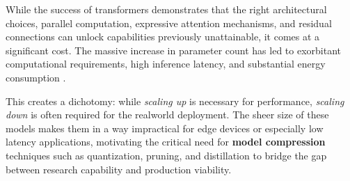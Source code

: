 While the success of transformers demonstrates that the right architectural choices, parallel computation, expressive attention mechanisms, and residual connections can unlock capabilities previously unattainable, it comes at a significant cost. The massive increase in parameter count has led to exorbitant computational requirements, high inference latency, and substantial energy consumption \cite{strubell2019energy}.

This creates a dichotomy: while \textit{scaling up} is necessary for performance, \textit{scaling down} is often required for the realworld deployment. The sheer size of these models makes them in a way impractical for edge devices or especially low latency applications, motivating the critical need for \textbf{model compression} techniques such as quantization, pruning, and distillation to bridge the gap between research capability and production viability.